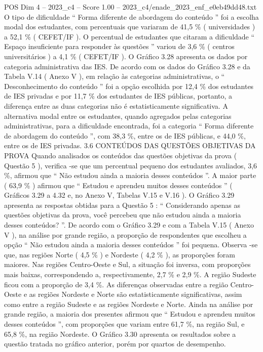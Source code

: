 \begin{textsample}{POS Dim 4 – 2023\_c4 – Score 1.00 – 2023\_c4/enade\_2023\_enf\_e0eb49dd48.txt}
O tipo de dificuldade “ Forma diferente de abordagem do conteúdo ” foi a escolha modal dos estudantes, com percentuais que variaram de 41,5 \% ( universidades ) a 52,1 \% ( CEFET/IF ).
O percentual de estudantes que citaram a dificuldade “ Espaço insuficiente para responder às questões ” variou de 3,6 \% ( centros universitários ) a 4,1 \% ( CEFET/IF ).
O Gráfico 3.28 apresenta os dados por categoria administrativa das IES.
De acordo com os dados do Gráfico 3.28 e da Tabela V.14 ( Anexo V ), em relação às categorias administrativas, o “ Desconhecimento do conteúdo ” foi a opção escolhida por 12,4 \% dos estudantes de IES privadas e por 11,7 \% dos estudantes de IES públicas, portanto, a diferença entre as duas categorias não é estatisticamente significativa.
A alternativa modal entre os estudantes, quando agregados pelas categorias administrativas, para a dificuldade encontrada, foi a categoria “ Forma diferente de abordagem do conteúdo ”, com 38,3 \%, entre os de IES públicas, e 44,0 \%, entre os de IES privadas. 3.6 CONTEÚDOS DAS QUESTÕES OBJETIVAS DA PROVA Quando analisados os conteúdos das questões objetivas da prova ( Questão 5 ), verifica -se que um percentual pequeno dos estudantes avaliados, 3,6 \%, afirmou que “ Não estudou ainda a maioria desses conteúdos ”.
A maior parte ( 63,9 \% ) afirmou que “ Estudou e aprendeu muitos desses conteúdos ” ( Gráficos 3.29 a 4.32 e, no Anexo V, Tabelas V.15 e V.16 ).
O Gráfico 3.29 apresenta as respostas obtidas para a Questão 5 : “ Considerando apenas as questões objetivas da prova, você percebeu que não estudou ainda a maioria desses conteúdos? ”.
De acordo com o Gráfico 3.29 e com a Tabela V.15 ( Anexo V ), na análise por grande região, a proporção de respondentes que escolheu a opção “ Não estudou ainda a maioria desses conteúdos ” foi pequena.
Observa -se que, nas regiões Norte ( 4,5 \% ) e Nordeste ( 4,2 \% ), as proporções foram maiores.
Nas regiões Centro-Oeste e Sul, a situação foi inversa, com proporções mais baixas, correspondendo a, respectivamente, 2,7 \% e 2,9 \%.
A região Sudeste ficou com a proporção de 3,4 \%.
As diferenças observadas entre a região Centro-Oeste e as regiões Nordeste e Norte são estatisticamente significativas, assim como entre a região Sudeste e as regiões Nordeste e Norte.
Ainda na análise por grande região, a maioria dos presentes afirmou que “ Estudou e aprendeu muitos desses conteúdos ”, com proporções que variam entre 61,7 \%, na região Sul, e 65,8 \%, na região Nordeste.
O Gráfico 3.30 apresenta os resultados sobre a questão tratada no gráfico anterior, porém por quartos de desempenho.

\end{textsample}
